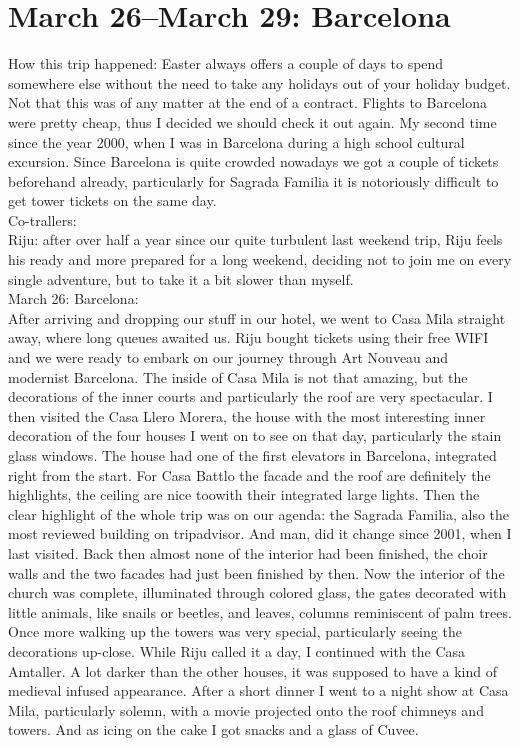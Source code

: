 \section{March 26--March 29: Barcelona}
\label{Barcelona2016}

How this trip happened: Easter always offers a couple of days to spend somewhere else without the need to take any holidays out of your holiday budget. Not that this was of any matter at the end of a contract. Flights to Barcelona were pretty cheap, thus I decided we should check it out again. My second time since the year 2000, when I was in Barcelona during a high school cultural excursion. Since Barcelona is quite crowded nowadays we got a couple of tickets beforehand already, particularly for Sagrada Familia it is notoriously difficult to get tower tickets on the same day.\\

Co-trallers:\\
Riju: after over half a year since our quite turbulent last weekend trip, Riju feels his ready and more prepared for a long weekend, deciding not to join me on every single adventure, but to take it a bit slower than myself.\\

March 26: Barcelona:\\
After arriving and dropping our stuff in our hotel, we went to Casa Mila straight away, where long queues awaited us. Riju bought tickets using their free WIFI and we were ready to embark on our journey through Art Nouveau and modernist Barcelona. The inside of Casa Mila is not that amazing, but the decorations of the inner courts and particularly the roof are very spectacular. I then visited the Casa Llero Morera, the house with the most interesting inner decoration of the four houses I went on to see on that day, particularly the stain glass windows. The house had one of the first elevators in Barcelona, integrated right from the start. For Casa Battlo the facade and the roof are definitely the highlights, the ceiling are nice toowith their integrated large lights. Then the clear highlight of the whole trip was on our agenda: the Sagrada Familia, also the most reviewed building on tripadvisor. And man, did it change since 2001, when I last visited. Back then almost none of the interior had been finished, the choir walls and the two facades had just been finished by then. Now the interior of the church was complete, illuminated through colored glass, the gates decorated with little animals, like snails or beetles, and leaves, columns reminiscent of palm trees. Once more walking up the towers was very special, particularly seeing the decorations up-close. While Riju called it a day, I continued with the Casa Amtaller. A lot darker than the other houses, it was supposed to have a kind of medieval infused appearance. After a short dinner I went to a night show at Casa Mila, particularly solemn, with a movie projected onto the roof chimneys and towers. And as icing on the cake I got snacks and a glass of Cuvee.\\

